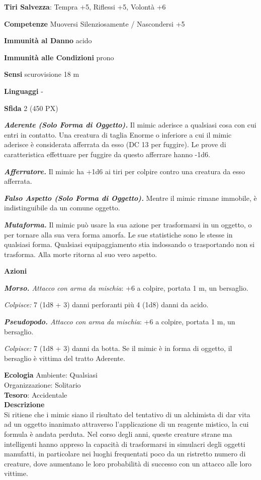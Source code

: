 \begin{multicols}{2}
\textbf{Tiri Salvezza}: Tempra +5, Riflessi +5, Volontà +6

\textbf{Competenze} Muoversi Silenziosamente / Nascondersi +5

\textbf{Immunità al Danno} acido

\textbf{Immunità alle Condizioni} prono

\textbf{Sensi} scurovisione 18 m

\textbf{Linguaggi} -

\textbf{Sfida} 2 (450 PX)

\textit{\textbf{Aderente (Solo Forma di Oggetto).}} Il mimic aderisce a qualsiasi cosa con cui entri in contatto. Una creatura di taglia Enorme o inferiore a cui il mimic aderisce è considerata afferrata da esso (DC 13 per fuggire). Le prove di caratteristica effettuare per fuggire da
questo afferrare hanno -1d6.

\textit{\textbf{Afferratore.}} Il mimic ha +1d6 ai tiri per colpire contro una creatura da esso afferrata.

\textit{\textbf{Falso Aspetto (Solo Forma di Oggetto).}} Mentre il mimic rimane immobile, è indistinguibile da un comune oggetto.

\textit{\textbf{Mutaforma.}} Il mimic può usare la sua azione per trasformarsi in un oggetto, o per tornare alla sua vera forma amorfa. Le sue statistiche sono le stesse in qualsiasi forma. Qualsiasi equipaggiamento stia indossando o trasportando non si trasforma. Alla morte ritorna al suo vero aspetto.

\textbf{Azioni}

\textit{\textbf{Morso.} Attacco con arma da mischia}: +6 a colpire, portata 1 m, un bersaglio.

\textit{Colpisce:} 7 (1d8 + 3) danni perforanti più 4 (1d8) danni da acido.

\textit{\textbf{Pseudopodo.} Attacco con arma da mischia}: +6 a colpire, portata 1 m, un bersaglio.

\textit{Colpisce:} 7 (1d8 + 3) danni da botta. Se il mimic è in forma di oggetto, il bersaglio è vittima del tratto Aderente.

\textbf{Ecologia}
Ambiente: Qualsiasi\\
Organizzazione: Solitario\\
\textbf{Tesoro}: Accidentale\\
\textbf{Descrizione}\\
Si ritiene che i mimic siano il risultato del tentativo di un alchimista di dar vita ad un oggetto inanimato attraverso l'applicazione di un reagente mistico, la cui formula è andata perduta. Nel corso degli anni, queste creature strane ma intelligenti hanno appreso la capacità di trasformarsi in simulacri degli oggetti manufatti, in particolare nei luoghi frequentati poco da un ristretto numero di creature, dove aumentano le loro probabilità di successo con un attacco alle loro vittime.


\end{multicols}
